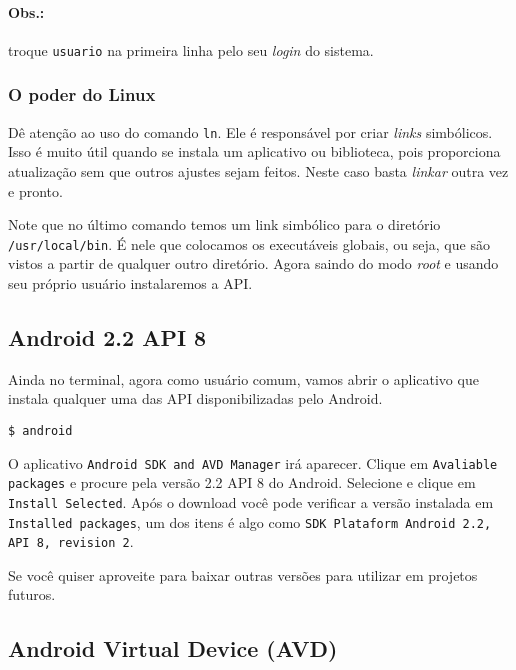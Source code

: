 \paragraph{Obs.:} troque \texttt{usuario} na primeira linha pelo seu \textit{login} do sistema.

\subsubsection{O poder do Linux}

Dê atenção ao uso do comando \texttt{ln}. Ele é responsável por criar \textit{links} simbólicos. Isso é
muito útil quando se instala um aplicativo ou biblioteca, pois proporciona atualização sem que
outros ajustes sejam feitos. Neste caso basta \textit{linkar} outra vez e pronto.

Note que no último comando temos um link simbólico para o diretório \texttt{/usr/local/bin}. É
nele que colocamos os executáveis globais, ou seja, que são vistos a partir de qualquer outro
diretório. Agora saindo do modo \textit{root} e usando seu próprio usuário instalaremos a API.

\subsection{Android 2.2 API 8}

Ainda no terminal, agora como usuário comum, vamos abrir o aplicativo que instala qualquer uma
das API disponibilizadas pelo Android.

\medskip

\begin{flushleft}
\texttt{\$ android}
\end{flushleft}

\medskip

O aplicativo \texttt{Android SDK and AVD Manager} irá aparecer. Clique em \texttt{Avaliable packages}
e procure pela versão 2.2 API 8 do Android. Selecione e clique em \texttt{Install Selected}. Após
o download você pode verificar a versão instalada em \texttt{Installed packages}, um dos itens é
algo como \texttt{SDK Plataform Android 2.2, API 8, revision 2}.

Se você quiser aproveite para baixar outras versões para utilizar em projetos futuros.

\subsection{Android Virtual Device (AVD)}

